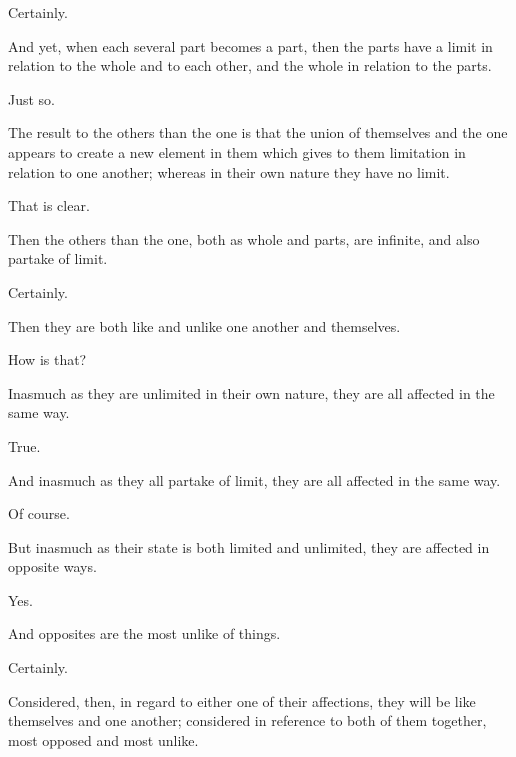 \documentclass[11pt,letter]{article}
\begin{document}
\par  Certainly.

\par  And yet, when each several part becomes a part, then the parts have a limit in relation to the whole and to each other, and the whole in relation to the parts.

\par  Just so.

\par  The result to the others than the one is that the union of themselves and the one appears to create a new element in them which gives to them limitation in relation to one another; whereas in their own nature they have no limit.

\par  That is clear.

\par  Then the others than the one, both as whole and parts, are infinite, and also partake of limit.

\par  Certainly.

\par  Then they are both like and unlike one another and themselves.

\par  How is that?

\par  Inasmuch as they are unlimited in their own nature, they are all affected in the same way.

\par  True.

\par  And inasmuch as they all partake of limit, they are all affected in the same way.

\par  Of course.

\par  But inasmuch as their state is both limited and unlimited, they are affected in opposite ways.

\par  Yes.

\par  And opposites are the most unlike of things.

\par  Certainly.

\par  Considered, then, in regard to either one of their affections, they will be like themselves and one another; considered in reference to both of them together, most opposed and most unlike.
\end{document}
